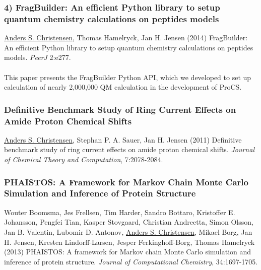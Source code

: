 \subsubsection{4) FragBuilder: An efficient Python library to setup quantum chemistry calculations on peptides models}
\underline{Anders S. Christensen}, Thomas Hamelryck, Jan H. Jensen (2014) FragBuilder: An efficient Python library to setup quantum chemistry calculations on peptides models. \textit{PeerJ} 2:e277.
\\\\This paper presents the FragBuilder Python API, which we developed to set up calculation of nearly 2,000,000 QM calculation in the development of ProCS.
\clearpage

\subsubsection{Definitive Benchmark Study of Ring Current Effects on Amide Proton Chemical Shifts}
\underline{Anders S. Christensen}, Stephan P. A. Sauer, Jan H. Jensen (2011) Definitive benchmark study of ring current effects on amide proton chemical shifts. \textit{Journal of Chemical Theory and Computation}, 7:2078-2084.
\clearpage


\subsubsection{PHAISTOS: A Framework for Markov Chain Monte Carlo Simulation and Inference of Protein Structure}
Wouter Boomsma, Jes Frellsen, Tim Harder, Sandro Bottaro, Kristoffer E. Johansson, Pengfei Tian, Kasper Stovgaard, Christian Andreetta, Simon Olsson, Jan B. Valentin, Lubomir D. Antonov, \underline{Anders S. Christensen}, Mikael Borg, Jan H. Jensen, Kresten Lindorff-Larsen, Jesper Ferkinghoff-Borg, Thomas Hamelryck (2013) PHAISTOS: A framework for Markov chain Monte Carlo simulation and inference of protein structure. \textit{Journal of Computational Chemistry}, 34:1697-1705.
\clearpage


